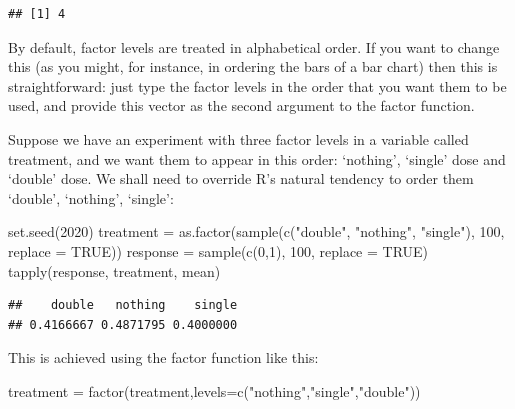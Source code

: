 \documentclass[
]{book}
\newenvironment{Shaded}{\begin{snugshade}}{\end{snugshade}}
\newcommand{\AttributeTok}[1]{\textcolor[rgb]{0.77,0.63,0.00}{#1}}
\newcommand{\ConstantTok}[1]{\textcolor[rgb]{0.00,0.00,0.00}{#1}}
\newcommand{\DecValTok}[1]{\textcolor[rgb]{0.00,0.00,0.81}{#1}}
\newcommand{\FunctionTok}[1]{\textcolor[rgb]{0.00,0.00,0.00}{#1}}
\newcommand{\NormalTok}[1]{#1}
\newcommand{\OtherTok}[1]{\textcolor[rgb]{0.56,0.35,0.01}{#1}}
\newcommand{\StringTok}[1]{\textcolor[rgb]{0.31,0.60,0.02}{#1}}
\begin{document}
\begin{verbatim}
## [1] 4
\end{verbatim}

By default, factor levels are treated in alphabetical order. If you want to change this (as you might, for instance, in ordering the bars of a bar chart) then this is straightforward: just type the factor levels in the order that you want them to be used, and provide this vector as the second argument to the factor function.

Suppose we have an experiment with three factor levels in a variable called treatment, and we want them to appear in this order: `nothing', `single' dose and `double' dose. We shall need to override R's natural tendency to order them `double', `nothing', `single':

\begin{Shaded}
\begin{Highlighting}[]
\FunctionTok{set.seed}\NormalTok{(}\DecValTok{2020}\NormalTok{)}
\NormalTok{treatment }\OtherTok{=} \FunctionTok{as.factor}\NormalTok{(}\FunctionTok{sample}\NormalTok{(}\FunctionTok{c}\NormalTok{(}\StringTok{"double"}\NormalTok{, }\StringTok{"nothing"}\NormalTok{, }\StringTok{"single"}\NormalTok{), }\DecValTok{100}\NormalTok{, }\AttributeTok{replace =} \ConstantTok{TRUE}\NormalTok{))}
\NormalTok{response }\OtherTok{=} \FunctionTok{sample}\NormalTok{(}\FunctionTok{c}\NormalTok{(}\DecValTok{0}\NormalTok{,}\DecValTok{1}\NormalTok{), }\DecValTok{100}\NormalTok{, }\AttributeTok{replace =} \ConstantTok{TRUE}\NormalTok{)}
\FunctionTok{tapply}\NormalTok{(response, treatment, mean)}
\end{Highlighting}
\end{Shaded}

\begin{verbatim}
##    double   nothing    single 
## 0.4166667 0.4871795 0.4000000
\end{verbatim}

This is achieved using the factor function like this:

\begin{Shaded}
\begin{Highlighting}[]
\NormalTok{treatment }\OtherTok{=} \FunctionTok{factor}\NormalTok{(treatment,}\AttributeTok{levels=}\FunctionTok{c}\NormalTok{(}\StringTok{"nothing"}\NormalTok{,}\StringTok{"single"}\NormalTok{,}\StringTok{"double"}\NormalTok{))}
\end{Highlighting}
\end{Shaded}
\end{document}
